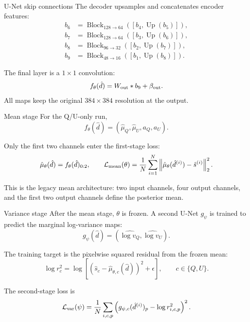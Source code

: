 \documentclass[aspectratio=169,11pt]{beamer}
\begin{document}
\begin{frame}[fragile]{U-Net skip connections}
The decoder upsamples and concatenates encoder features:
\[
\begin{aligned}
  b_6&=\operatorname{Block}_{128\to64}
       \left([b_4,\operatorname{Up}(b_5)]\right),\\
  b_7&=\operatorname{Block}_{128\to64}
       \left([b_3,\operatorname{Up}(b_6)]\right),\\
  b_8&=\operatorname{Block}_{96\to32}
       \left([b_2,\operatorname{Up}(b_7)]\right),\\
  b_9&=\operatorname{Block}_{48\to16}
       \left([b_1,\operatorname{Up}(b_8)]\right).
\end{aligned}
\]

\vspace{0.25em}
The final layer is a $1\times1$ convolution:
\[
  f_\theta(\hat d)=W_{\rm out}*b_9+\beta_{\rm out}.
\]
All maps keep the original $384\times384$ resolution at the output.
\end{frame}

\begin{frame}[fragile]{Mean stage}
For the Q/U-only run,
\[
  f_\theta(\hat d)
  =
  (\hat\mu_Q,\hat\mu_U,a_Q,a_U).
\]

\vspace{0.25em}
Only the first two channels enter the first-stage loss:
\[
  \hat\mu_\theta(\hat d)=f_\theta(\hat d)_{0:2},
  \qquad
  \mathcal L_{\rm mean}(\theta)
  =
  \frac{1}{N}\sum_{i=1}^{N}
  \left\|
    \hat\mu_\theta(\hat d^{(i)})-\hat s^{(i)}
  \right\|_2^2 .
\]

\vspace{0.25em}
This is the legacy mean architecture: two input channels, four output
channels, and the first two output channels define the posterior mean.
\end{frame}

\begin{frame}[fragile]{Variance stage}
After the mean stage, $\theta$ is frozen.  A second U-Net $g_\psi$ is trained
to predict the marginal log-variance maps:
\[
  g_\psi(\hat d)=(\widehat{\log v_Q},\widehat{\log v_U}).
\]

\vspace{0.25em}
The training target is the pixelwise squared residual from the frozen mean:
\[
  \log r_c^2
  =
  \log\left[
    \left(\hat s_c-\hat\mu_{\theta,c}(\hat d)\right)^2+\epsilon
  \right],
  \qquad c\in\{Q,U\}.
\]

\vspace{0.25em}
The second-stage loss is
\[
  \mathcal L_{\rm var}(\psi)
  =
  \frac{1}{N}\sum_{i,c,p}
  \left(
    g_{\psi,c}(\hat d^{(i)})_p-\log r_{i,c,p}^2
  \right)^2.
\]
\end{frame}
\end{document}
